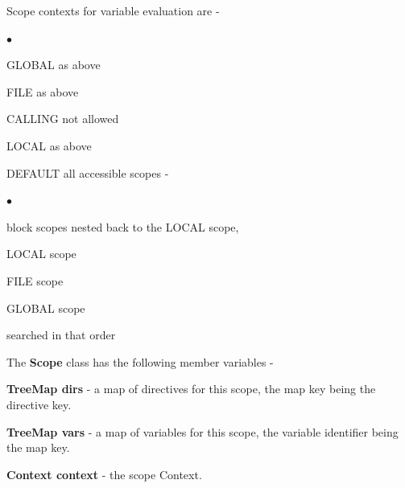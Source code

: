 \documentclass[10pt,a4paper,twoside,fleqn]{book}
\newcommand{\blist}{\begin{list}{$\bullet$}{\setlength{\itemsep}{-5pt}\setlength{\topsep}{-5pt}}}
\newcommand{\blend}{\end{list}}
\begin{document}
            Scope contexts for variable evaluation are -
            \blist
            \item   GLOBAL  as above
            \item   FILE    as above
            \item   CALLING not allowed
            \item   LOCAL   as above
            \item   DEFAULT all accessible scopes -
                            \blist
                            \item   block scopes nested back to the LOCAL scope,
                            \item   LOCAL scope
                            \item   FILE scope
                            \item   GLOBAL scope
                            \blend
                            searched in that order
            \blend

            The {\bf Scope} class has the following member variables -

            {\bf TreeMap dirs} - a map of directives for this scope, the map key
            being the directive key.

            {\bf TreeMap vars} - a map of variables for this scope, the variable
            identifier being the map key.

            {\bf Context context} - the scope Context.
\end{document}
